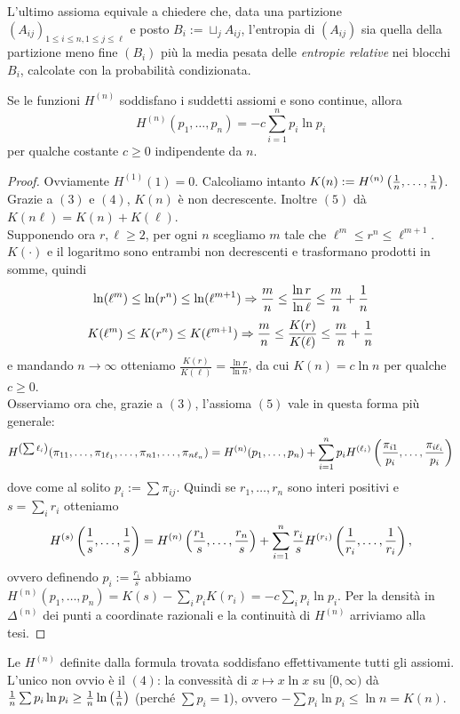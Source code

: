 L'ultimo assioma equivale a chiedere che, data una partizione $(A_{ij})_{1\le i\le n,1\le j\le\ell}$
e posto $B_i:=\sqcup_j A_{ij}$, l'entropia di $(A_{ij})$ sia quella della partizione meno fine $(B_i)$
più la media pesata delle \emph{entropie relative} nei blocchi $B_i$, calcolate con la probabilità condizionata.

\begin{teo}Se le funzioni $H^{(n)}$ soddisfano i suddetti assiomi e sono continue, allora
\[ H^{(n)}(p_1,\dots,p_n)=-c\sum_{i=1}^n p_i\ln p_i \]
per qualche costante $c\ge 0$ indipendente da $n$.
\end{teo}

\begin{proof}Ovviamente $H^{(1)}(1)=0$. Calcoliamo intanto
$K(n):=H^{(n)}\left(\frac{1}{n},\dots,\frac{1}{n}\right)$. \\
Grazie a $(3)$ e $(4)$, $K(n)$ è non decrescente. Inoltre $(5)$ dà $K(n\ell)=K(n)+K(\ell)$. \\
Supponendo ora $r,\ell\ge 2$, per ogni $n$ scegliamo $m$ tale che $\ell^m\le r^n\le\ell^{m+1}$.
$K(\cdot)$ e il logaritmo sono entrambi non decrescenti e trasformano prodotti in somme, quindi
\[ \ln(\ell^m)\le\ln(r^n)\le\ln(\ell^{m+1})\Rightarrow \frac{m}{n}\le\frac{\ln r}{\ln \ell}\le\frac{m}{n}+\frac{1}{n} \]
\[ K(\ell^m)\le K(r^n)\le K(\ell^{m+1})\Rightarrow \frac{m}{n}\le\frac{K(r)}{K(\ell)}\le\frac{m}{n}+\frac{1}{n} \]
e mandando $n\to\infty$ otteniamo $\frac{K(r)}{K(\ell)}=\frac{\ln r}{\ln n}$, da cui $K(n)=c\ln n$ per qualche $c\ge 0$. \\
Osserviamo ora che, grazie a $(3)$, l'assioma $(5)$ vale in questa forma più generale:
\[ H^{\left(\sum \ell_i\right)}(\pi_{11},\dots,\pi_{1\ell_1},\dots,\pi_{n1},\dots,\pi_{n\ell_n})
=H^{(n)}(p_1,\dots,p_n)+\sum_{i=1}^n p_i H^{(\ell_i)}\left(\frac{\pi_{i1}}{p_i},\dots,\frac{\pi_{i\ell_i}}{p_i}\right) \]
dove come al solito $p_i:=\sum \pi_{ij}$. Quindi se $r_1,\dots,r_n$ sono interi positivi e $s=\sum_i r_i$ otteniamo
\[ H^{(s)}\left(\frac{1}{s},\dots,\frac{1}{s}\right)=H^{(n)}\left(\frac{r_1}{s},\dots,\frac{r_n}{s}\right)
+\sum_{i=1}^n \frac{r_i}{s}H^{(r_i)}\left(\frac{1}{r_i},\dots,\frac{1}{r_i}\right), \]
ovvero definendo $p_i:=\frac{r_i}{s}$ abbiamo $H^{(n)}(p_1,\dots,p_n)=K(s)-\sum_i p_i K(r_i)=-c\sum_i p_i\ln p_i$.
Per la densità in $\Delta^{(n)}$ dei punti a coordinate razionali e la continuità di $H^{(n)}$ arriviamo alla tesi.
\end{proof}

\begin{oss}Le $H^{(n)}$ definite dalla formula trovata soddisfano effettivamente tutti gli assiomi.
L'unico non ovvio è il $(4)$: la convessità di $x\mapsto x\ln x$ su $[0,\infty)$ dà
$\frac{1}{n}\sum p_i\ln p_i\ge\frac{1}{n}\ln\left(\frac{1}{n}\right)$ (perché $\sum p_i=1$), ovvero
$-\sum p_i\ln p_i\le\ln n=K(n)$.
\end{oss}

